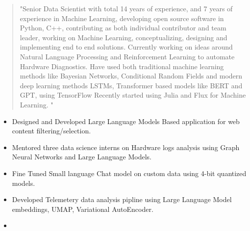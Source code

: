 \documentclass[10pt,a4paper,ragged2e,withhyper]{altacv}
\author{Aidan Scannell}
\date{\today}
\title{}
\begin{document}

\makecvheader

\begin{paracol}{2}
 \begin{quote}
"Senior Data Scientist with total 14 years of experience, and 7 years of experience in Machine Learning, developing open source software in Python, C++, contributing as both individual contributor and team leader, working on Machine Learning, conceptualizing, designing and implementing end to end solutions. Currently working on ideas around Natural Language Processing and Reinforcement Learning to automate Hardware Diagnostics. Have used both traditional machine learning methods like Bayesian Networks, Conditional Random Fields and modern deep learning methods LSTMs, Transformer based models like BERT and GPT, using TensorFlow Recently started using Julia and Flux for Machine Learning.
"
 \end{quote}
\label{sec:org980d01b}


\divider


\label{sec:orge98f48b}

\begin{itemize}
\item Designed and Developed Large Language Models Based application for web content filtering/selection.
\item Mentored three data science interns on Hardware logs analysis using Graph
Neural Networks and Large Language Models.
\item Fine Tuned Small language Chat model on custom data using 4-bit quantized models.
\item Developed Telemetery data analysis pipline using Large Language Model
embeddings, UMAP, Variational AutoEncoder.
\item 
\end{itemize}


\end{paracol}
\end{document}
